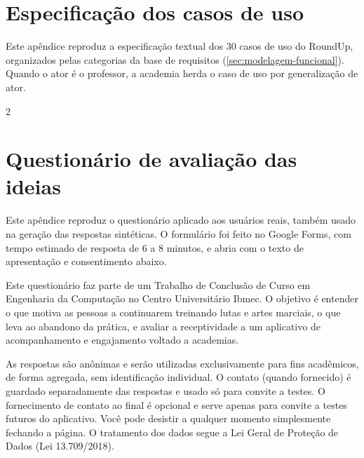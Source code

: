 \begin{apendicesenv}
\partapendices
{}

\chapter{Especificação dos casos de uso}
\label{ap:casos-uso}

Este apêndice reproduz a especificação textual dos 30 casos de uso do
RoundUp, organizados pelas categorias da base de requisitos
(\autoref{sec:modelagem-funcional}). Quando o ator é o professor, a
academia herda o caso de uso por generalização de ator.

{\footnotesize\SingleSpacing
\setlength{\columnsep}{0.8cm}
\begin{multicols}{2}

\end{multicols}
}

\chapter{Questionário de avaliação das ideias}
\label{ap:questionario}

Este apêndice reproduz o questionário aplicado aos usuários reais, também
usado na geração das respostas sintéticas. O formulário foi feito no
Google Forms, com tempo estimado de resposta de 6 a 8 minutos, e abria com
o texto de apresentação e consentimento abaixo.

\begin{citacao}
Este questionário faz parte de um Trabalho de Conclusão de Curso em
Engenharia da Computação no Centro Universitário Ibmec. O objetivo é
entender o que motiva as pessoas a continuarem treinando lutas e artes
marciais, o que leva ao abandono da prática, e avaliar a receptividade a
um aplicativo de acompanhamento e engajamento voltado a academias.

As respostas são anônimas e serão utilizadas exclusivamente para fins
acadêmicos, de forma agregada, sem identificação individual. O contato
(quando fornecido) é guardado separadamente das respostas e usado só para
convite a testes. O fornecimento de contato ao final é opcional e serve
apenas para convite a testes futuros do aplicativo. Você pode desistir a
qualquer momento simplesmente fechando a página. O tratamento dos dados
segue a Lei Geral de Proteção de Dados (Lei 13.709/2018).


\end{citacao}
\end{apendicesenv}

